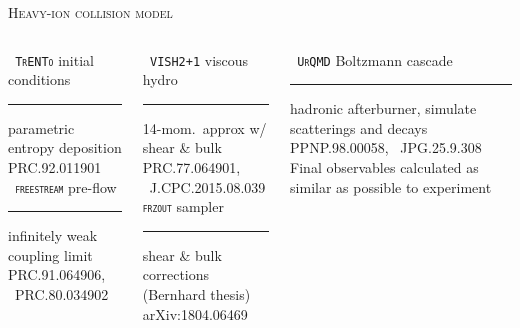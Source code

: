 \documentclass[aspectratio=169]{beamer}
\begin{document}
\begin{frame}[t]{\scshape Heavy-ion collision model}
  \centering
  \medskip
  \begin{columns}[T]
    \begin{column}{0.3\textwidth}
      \texttt{\scshape\color{theme} TrENTo} {\small initial conditions}\\
      \smallskip\hrule\medskip
      {\scriptsize parametric entropy deposition}\\
      {\tiny \color{theme}PRC.92.011901}\\[2ex]
      \texttt{\scshape\color{theme} freestream} {\small pre-flow}\\
      \smallskip\hrule\medskip
      {\scriptsize infinitely weak coupling limit}\\
      {\tiny \color{theme} PRC.91.064906, ~PRC.80.034902}
    \end{column}
    \hfill
    \begin{column}{0.3\textwidth}
      \texttt{\scshape\color{theme} VISH2+1} {\small viscous hydro}\\
      \smallskip\hrule\medskip
      {\scriptsize 14-mom.\ approx w/ shear \& bulk}\\
      {\tiny \color{theme} PRC.77.064901, ~J.CPC.2015.08.039}\\[2ex]
      \texttt{\scshape\color{theme}frzout} {\small sampler}\\
      \smallskip\hrule\medskip
      {\scriptsize shear \& bulk corrections}\\
      {\tiny \color{theme} (Bernhard thesis) arXiv:1804.06469}
    \end{column}
    \hfill
    \begin{column}{0.3\textwidth}
      \texttt{\scshape\color{theme} UrQMD} {\small Boltzmann cascade}
      \smallskip\hrule\medskip
      {\scriptsize hadronic afterburner, simulate scatterings and decays}\\
      {\tiny\color{theme} PPNP.98.00058, ~JPG.25.9.308}\\[2ex]
      {\scriptsize Final observables calculated as similar as possible to experiment}
    \end{column}
  \end{columns}
\end{frame}
\end{document}
